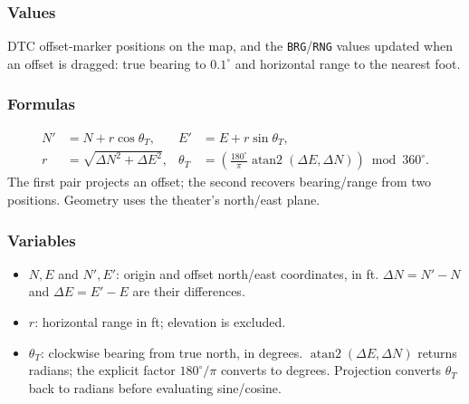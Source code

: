 \documentclass[10pt,a4paper]{amsart}
\DeclareMathOperator{\atan}{atan2}
\begin{document}
\subsubsection*{Values}
DTC offset-marker positions on the map, and the \texttt{BRG}/\texttt{RNG}
values updated when an offset is dragged: true bearing to $0.1^\circ$
and horizontal range to the nearest foot.

\subsubsection*{Formulas}
\begin{align*}
 N'&=N+r\cos\theta_T,& E'&=E+r\sin\theta_T,\\
 r&=\sqrt{\Delta N^2+\Delta E^2},&
 \theta_T&=\left(\frac{180^\circ}{\pi}\atan(\Delta E,\Delta N)\right)
             \bmod360^\circ.
\end{align*}
The first pair projects an offset; the second recovers bearing/range
from two positions. Geometry uses the theater's north/east plane.

\subsubsection*{Variables}
\begin{itemize}
\setlength{\itemsep}{0pt}
\setlength{\parsep}{0pt}
\item $N,E$ and $N',E'$: origin and offset north/east coordinates, in ft.
$\Delta N=N'-N$ and $\Delta E=E'-E$ are their differences.
\item $r$: horizontal range in ft; elevation is excluded.
\item $\theta_T$: clockwise bearing from true north, in degrees.
$\atan(\Delta E,\Delta N)$ returns radians; the explicit factor
$180^\circ/\pi$ converts to degrees. Projection converts $\theta_T$
back to radians before evaluating sine/cosine.
\end{itemize}
\end{document}
